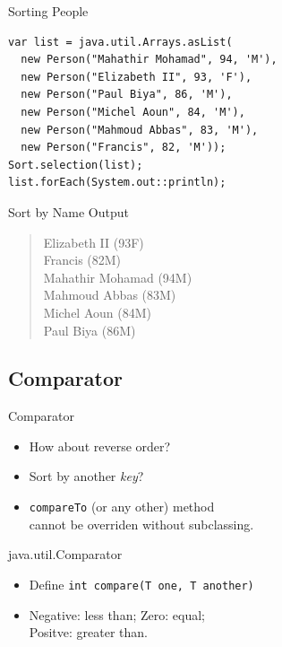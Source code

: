 \documentclass[pdf]{beamer}
\begin{document}

\begin{frame}[fragile]{Sorting People}
\begin{verbatim}
var list = java.util.Arrays.asList(
  new Person("Mahathir Mohamad", 94, 'M'),
  new Person("Elizabeth II", 93, 'F'),
  new Person("Paul Biya", 86, 'M'),
  new Person("Michel Aoun", 84, 'M'),
  new Person("Mahmoud Abbas", 83, 'M'),
  new Person("Francis", 82, 'M'));
Sort.selection(list);
list.forEach(System.out::println);
\end{verbatim}
\end{frame}

\begin{frame}[fragile]{Sort by Name Output}\Large
  \begin{quote}
    Elizabeth II (93F)\\
    Francis (82M)\\
    Mahathir Mohamad (94M)\\
    Mahmoud Abbas (83M)\\
    Michel Aoun (84M)\\
    Paul Biya (86M)
  \end{quote}
\end{frame}

\subsection{Comparator}
\begin{frame}[fragile]{Comparator}\Large
  \begin{itemize}
    \item How about reverse order?
    \item Sort by another \emph{key}?
    \item \verb|compareTo| (or any other) method\\
      cannot be overriden without subclassing.
  \end{itemize}
\end{frame}

\begin{frame}[fragile]{java.util.Comparator}\Large
  \begin{itemize}
    \item Define \verb|int compare(T one, T another)|
    \item Negative: less than; Zero: equal;\\
      Positve: greater than.
  \end{itemize}
\end{frame}
\end{document}

